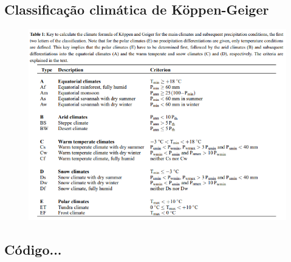 \documentclass[brazil,hardcopy,openany,a4paper]{_ufscthesis}
\begin{document}
\begin{appendices}
	\chapter{Classificação climática de Köppen-Geiger}
	\begin{figure}[!h]
		\centering
		\includegraphics[width=1\linewidth]{img/tablekoppengeiger1.png}
		\label{fig:tablekoppengeiger1}
	\end{figure}
\end{appendices}

\begin{appendices}
	\chapter{Código...}
	\lstset{language=c++}
	\lstset{basicstyle=\tiny}	
	
\end{appendices}

%
%

	
\end{document}
